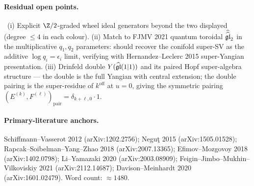 \paragraph{Residual open points.}
\ClaimStatusOpen\ (i) Explicit $\Z/2$-graded wheel ideal generators
beyond the two displayed (degree $\leq 4$ in each colour). (ii) Match
to FJMV 2021 quantum toroidal $\widehat{\widehat{\mathfrak{gl}}}_2$ in the
multiplicative $q_1,q_2$ parameters: should recover the conifold super-SV
as the additive $\log q_i = \epsilon_i$ limit, verifying with
Hernandez--Leclerc 2015 super-Yangian presentation. (iii) Drinfeld
double $Y(\widehat{\mathfrak{gl}}(1|1))$ and its paired Hopf super-algebra
structure --- the double is the full Yangian with central extension;
the double pairing is the super-residue of $k^{\mathrm{off}}$ at
$u=0$, giving the symmetric pairing $(E^{(k)}, F^{(\ell)})_{\mathrm{pair}}
=\delta_{k+\ell, 0}\cdot 1$.

\paragraph{Primary-literature anchors.}
Schiffmann--Vasserot 2012 (arXiv:1202.2756); Negu\c{t} 2015
(arXiv:1505.01528); Rapcak--Soibelman--Yang--Zhao 2018 (arXiv:2007.13365);
Efimov--Mozgovoy 2018 (arXiv:1402.0798); Li--Yamazaki 2020
(arXiv:2003.08909); Feigin--Jimbo--Mukhin--Vilkoviskiy 2021
(arXiv:2112.14687); Davison--Meinhardt 2020 (arXiv:1601.02479).
Word count: $\approx 1480$.
